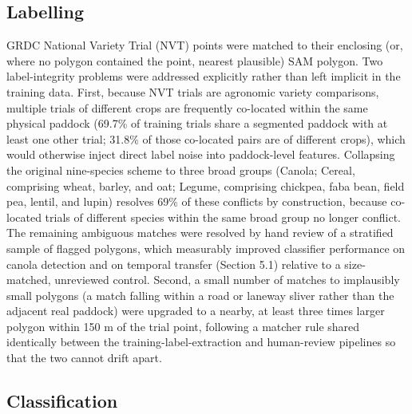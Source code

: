 \subsection{Labelling}\label{labelling}

GRDC National Variety Trial (NVT) points were matched to their enclosing (or, where no polygon contained the point, nearest plausible) SAM polygon. Two label-integrity problems were addressed explicitly rather than left implicit in the training data. First, because NVT trials are agronomic variety comparisons, multiple trials of different crops are frequently co-located within the same physical paddock (69.7\% of training trials share a segmented paddock with at least one other trial; 31.8\% of those co-located pairs are of different crops), which would otherwise inject direct label noise into paddock-level features. Collapsing the original nine-species scheme to three broad groups (Canola; Cereal, comprising wheat, barley, and oat; Legume, comprising chickpea, faba bean, field pea, lentil, and lupin) resolves 69\% of these conflicts by construction, because co-located trials of different species within the same broad group no longer conflict. The remaining ambiguous matches were resolved by hand review of a stratified sample of flagged polygons, which measurably improved classifier performance on canola detection and on temporal transfer (Section 5.1) relative to a size-matched, unreviewed control. Second, a small number of matches to implausibly small polygons (a match falling within a road or laneway sliver rather than the adjacent real paddock) were upgraded to a nearby, at least three times larger polygon within 150 m of the trial point, following a matcher rule shared identically between the training-label-extraction and human-review pipelines so that the two cannot drift apart.

\subsection{Classification}\label{classification}

